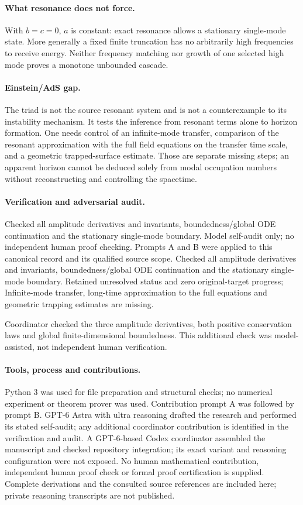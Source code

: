 \documentclass[11pt]{article}
\begin{document}
\paragraph{What resonance does not force.} With $b=c=0$, $a$ is constant: exact resonance allows a stationary single-mode state. More generally a fixed finite truncation has no arbitrarily high frequencies to receive energy. Neither frequency matching nor growth of one selected high mode proves a monotone unbounded cascade.

\paragraph{Einstein/AdS gap.} The triad is not the source resonant system and is not a counterexample to its instability mechanism. It tests the inference from resonant terms alone to horizon formation. One needs control of an infinite-mode transfer, comparison of the resonant approximation with the full field equations on the transfer time scale, and a geometric trapped-surface estimate. Those are separate missing steps; an apparent horizon cannot be deduced solely from modal occupation numbers without reconstructing and controlling the spacetime.

\paragraph{Verification and adversarial audit.}
Checked all amplitude derivatives and invariants, boundedness/global ODE continuation and the stationary single-mode boundary. Model self-audit only; no independent human proof checking. Prompts A and B were applied to this canonical record and its qualified source scope. Checked all amplitude derivatives and invariants, boundedness/global ODE continuation and the stationary single-mode boundary. Retained unresolved status and zero original-target progress; Infinite-mode transfer, long-time approximation to the full equations and geometric trapping estimates are missing.

Coordinator checked the three amplitude derivatives, both positive conservation laws and global finite-dimensional boundedness. This additional check was model-assisted, not independent human verification.

\paragraph{Tools, process and contributions.}
Python 3 was used for file preparation and structural checks; no numerical experiment or theorem prover was used. Contribution prompt A was followed by prompt B. GPT-6 Astra with ultra reasoning drafted the research and performed its stated self-audit; any additional coordinator contribution is identified in the verification and audit. A GPT-6-based Codex coordinator assembled the manuscript and checked repository integration; its exact variant and reasoning configuration were not exposed. No human mathematical contribution, independent human proof check or formal proof certification is supplied. Complete derivations and the consulted source references are included here; private reasoning transcripts are not published.
\end{document}
